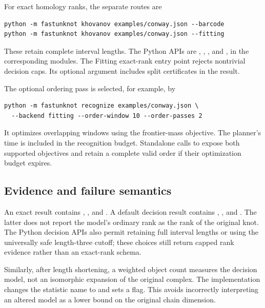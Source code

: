 \par\noindent\begin{minipage}{\linewidth}
For exact homology ranks, the separate routes are
\begin{lstlisting}
python -m fastunknot khovanov examples/conway.json --barcode
python -m fastunknot khovanov examples/conway.json --fitting
\end{lstlisting}
\end{minipage}\par
These retain complete interval lengths. The Python APIs are
, ,
, and , in the
corresponding modules. The Fitting exact-rank entry point rejects nontrivial
decision caps. Its optional  argument includes
split certificates in the result.

The optional ordering pass is selected, for example, by
\begin{lstlisting}
python -m fastunknot recognize examples/conway.json \
  --backend fitting --order-window 10 --order-passes 2
\end{lstlisting}
It optimizes overlapping windows using the frontier-mass objective. The
planner's time is included in the recognition budget. Standalone calls to
\code{improve\_scan\_order} expose both supported objectives and retain a
complete valid order if their optimization budget expires.

\subsection{Evidence and failure semantics}
An exact result contains , , and
. A default decision result contains ,
\code{rank\_cap=3}, and \code{length\_cap=2}. The latter does not report
the model's ordinary rank as the rank of the original knot.
The Python decision APIs also permit retaining full interval lengths or using
the universally safe length-three cutoff; these choices still return capped
rank evidence rather than an exact-rank schema.

Similarly, after length shortening, a weighted object count measures the
decision model, not an isomorphic expansion of the original complex.
The implementation changes the statistic name to
 and sets a
 flag. This avoids incorrectly interpreting
an altered model as a lower bound on the original chain dimension.

